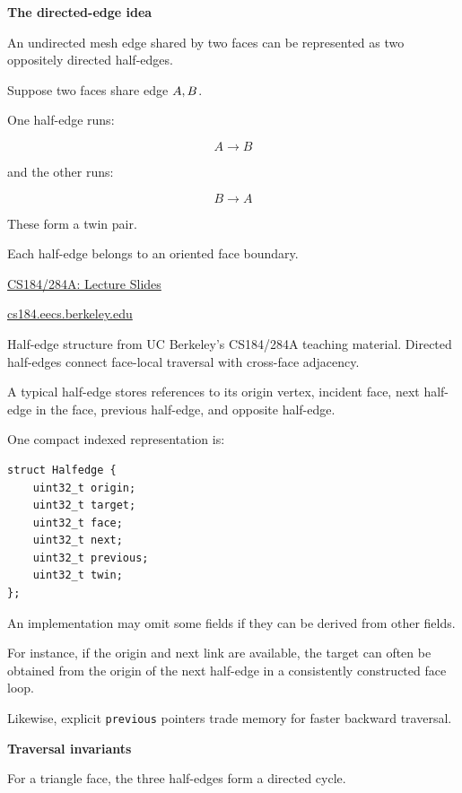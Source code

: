 \textbf{The directed-edge idea}

An undirected mesh edge shared by two faces can be represented as two oppositely directed half-edges.

Suppose two faces share edge \(\\{A,B\\}\).

One half-edge runs:

\[
A\rightarrow B
\]

and the other runs:

\[
B\rightarrow A
\]

These form a twin pair.

Each half-edge belongs to an oriented face boundary.

\href{https://images.openai.com/static-rsc-4/LdXoMoReUJDWQboTFXVax9msgYiH4uAONkFXepPt9uBAax1LtEbQnjRwODfP4xjW6xhyN2dqUlCjk4_q5ugu0OYA8ggDScUVP5zv9ajTYRBc4W7Y_7wK4JjygNR75J6KtdaA5pZ5rI45muKmzksWb0_Y8eLucg-e4t2K7mYP_l0?purpose=inline}{CS184/284A: Lecture Slides}

\href{https://cs184.eecs.berkeley.edu/sp24/lecture/8-24/mesh-processing-and-geometry-pro?utm_source=chatgpt.com}{cs184.eecs.berkeley.edu}

Half-edge structure from UC Berkeley's CS184/284A teaching material. Directed half-edges connect face-local traversal with cross-face adjacency.

A typical half-edge stores references to its origin vertex, incident face, next half-edge in the face, previous half-edge, and opposite half-edge.

One compact indexed representation is:

\begin{verbatim}
struct Halfedge {
    uint32_t origin;
    uint32_t target;
    uint32_t face;
    uint32_t next;
    uint32_t previous;
    uint32_t twin;
};
\end{verbatim}

An implementation may omit some fields if they can be derived from other fields.

For instance, if the origin and next link are available, the target can often be obtained from the origin of the next half-edge in a consistently constructed face loop.

Likewise, explicit \texttt{previous} pointers trade memory for faster backward traversal.

\textbf{Traversal invariants}

For a triangle face, the three half-edges form a directed cycle.

